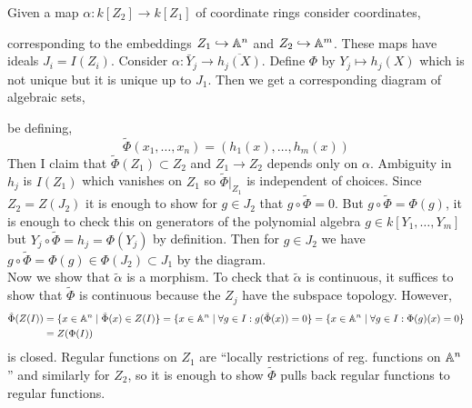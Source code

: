 \documentclass[12pt]{article}
\begin{document}
\begin{example}
Given a map $\alpha : k[Z_2] \to k[Z_1]$ of coordinate rings consider coordinates,
\begin{center}
\end{center}
corresponding to the embeddings $Z_1 \hookrightarrow \mathbb{A}^n$ and $Z_2 \hookrightarrow \mathbb{A}^m$. These maps have ideals $J_i = I(Z_i)$. Consider $\alpha : \bar{Y}_j \to \overline{h_j(X)}$. Define $\Phi$ by $Y_j \mapsto h_j(X)$ which is not unique but it is unique up to $J_1$. Then we get a corresponding diagram of algebraic sets,
\begin{center}
\end{center}
be defining,
\[ \tilde{\Phi}(x_1, \dots, x_n) = (h_1(x), \dots, h_m(x)) \]
Then I claim that $\tilde{\Phi}(Z_1) \subset Z_2$ and $Z_1 \to Z_2$ depends only on $\alpha$. Ambiguity in $h_j$ is $I(Z_1)$ which vanishes on $Z_1$ so $\tilde{\Phi}|_{Z_1}$ is independent of choices. Since $Z_2 = Z(J_2)$ it is enough to show for $g \in J_2$ that $g \circ \tilde{\Phi} = 0$. But $g \circ \tilde{\Phi} = \Phi(g)$, it is enough to check this on generators of the polynomial algebra $g \in k[Y_1, \dots, Y_m]$ but $Y_j \circ \tilde{\Phi} = h_j = \Phi(Y_j)$ by definition. Then for $g \in J_2$ we have $g \circ \tilde{\Phi} = \Phi(g) \in \Phi(J_2) \subset J_1$ by the diagram. 
\bigskip\\
Now we show that $\tilde{\alpha}$ is a morphism. To check that $\tilde{\alpha}$ is continuous, it suffices to show that $\tilde{\Phi}$ is continuous because the $Z_j$ have the subspace topology. However, 
\begin{align*}
\tilde{\Phi}(Z(I)) & = \{ x \in \mathbb{A}^n \mid \tilde{\Phi}(x) \in Z(I) \} = \{ x \in \mathbb{A}^n \mid \forall g \in I : g(\tilde{\Phi}(x)) = 0 \} = \{ x \in \mathbb{A}^n \mid \forall g \in I : \Phi(g)(x) = 0 \} 
\\
& = Z(\Phi(I))
\end{align*}
is closed. Regular functions on $Z_1$ are ``locally restrictions of reg. functions on $\mathbb{A}^n$'' and similarly for $Z_2$, so it is enough to show $\tilde{\Phi}$ pulls back regular functions to regular functions.

\end{example}
\end{document}
